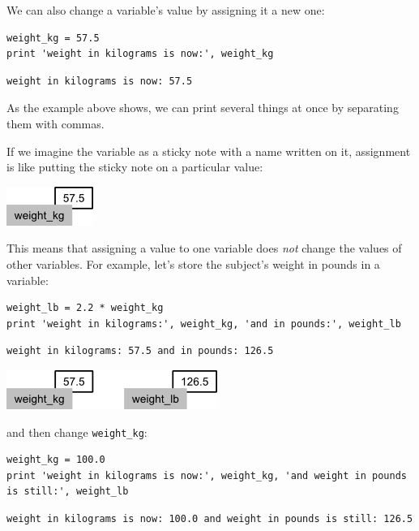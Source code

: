 \documentclass{book}
\begin{document}
We can also change a variable's value by assigning it a new one:

\begin{verbatim}
weight_kg = 57.5
print 'weight in kilograms is now:', weight_kg
\end{verbatim}

\begin{verbatim}
weight in kilograms is now: 57.5
\end{verbatim}

As the example above shows, we can print several things at once by
separating them with commas.

If we imagine the variable as a sticky note with a name written on it,
assignment is like putting the sticky note on a particular value:

\includegraphics{novice/python/img/python-sticky-note-variables-01.png}

This means that assigning a value to one variable does \emph{not} change
the values of other variables. For example, let's store the subject's
weight in pounds in a variable:

\begin{verbatim}
weight_lb = 2.2 * weight_kg
print 'weight in kilograms:', weight_kg, 'and in pounds:', weight_lb
\end{verbatim}

\begin{verbatim}
weight in kilograms: 57.5 and in pounds: 126.5
\end{verbatim}

\includegraphics{novice/python/img/python-sticky-note-variables-02.png}

and then change \texttt{weight\_kg}:

\begin{verbatim}
weight_kg = 100.0
print 'weight in kilograms is now:', weight_kg, 'and weight in pounds is still:', weight_lb
\end{verbatim}

\begin{verbatim}
weight in kilograms is now: 100.0 and weight in pounds is still: 126.5
\end{verbatim}
\end{document}
